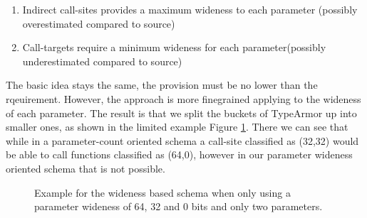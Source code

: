 \begin{enumerate}
\item Indirect call-sites provides a maximum wideness to each parameter (possibly overestimated compared to source)
\item Call-targets require a minimum wideness for each parameter(possibly underestimated compared to source)
\end{enumerate}
The basic idea stays the same, the provision must be no lower than the rqeuirement. However, the approach is more finegrained applying to the wideness of each parameter. The result is that we split the buckets of TypeArmor up into smaller ones, as shown in the limited example Figure \ref{fig:lattice3264}. There we can see that while in a parameter-count oriented
schema a call-site classified as (32,32) would be able to call functions classified as (64,0), however
in our parameter wideness oriented schema that is not possible.

\begin{figure}[h!]
\centering
{}
\caption{Example for the wideness based schema when only using a parameter wideness of 64, 32 and 0 bits and only two parameters.}
\label{fig:lattice3264}
\end{figure}

